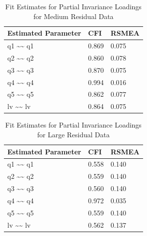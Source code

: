 \documentclass[
  man]{apa7}
\begin{document}
\begin{table}[tbp]

\begin{center}
\begin{threeparttable}

\caption{\label{tab:p-tab19}Fit Estimates for Partial Invariance Loadings for Medium Residual Data}

\begin{tabular}{lll}
\toprule
Estimated Parameter & CFI & RSMEA\\
\midrule
q1 \textasciitilde{}\textasciitilde{} q1 & 0.869 & 0.075\\
q2 \textasciitilde{}\textasciitilde{} q2 & 0.860 & 0.078\\
q3 \textasciitilde{}\textasciitilde{} q3 & 0.870 & 0.075\\
q4 \textasciitilde{}\textasciitilde{} q4 & 0.994 & 0.016\\
q5 \textasciitilde{}\textasciitilde{} q5 & 0.862 & 0.077\\
lv \textasciitilde{}\textasciitilde{} lv & 0.864 & 0.075\\
\bottomrule
\end{tabular}

\end{threeparttable}
\end{center}

\end{table}

\begin{table}[tbp]

\begin{center}
\begin{threeparttable}

\caption{\label{tab:p-tab20}Fit Estimates for Partial Invariance Loadings for Large Residual Data}

\begin{tabular}{lll}
\toprule
Estimated Parameter & CFI & RSMEA\\
\midrule
q1 \textasciitilde{}\textasciitilde{} q1 & 0.558 & 0.140\\
q2 \textasciitilde{}\textasciitilde{} q2 & 0.559 & 0.140\\
q3 \textasciitilde{}\textasciitilde{} q3 & 0.560 & 0.140\\
q4 \textasciitilde{}\textasciitilde{} q4 & 0.972 & 0.035\\
q5 \textasciitilde{}\textasciitilde{} q5 & 0.559 & 0.140\\
lv \textasciitilde{}\textasciitilde{} lv & 0.562 & 0.137\\
\bottomrule
\end{tabular}

\end{threeparttable}
\end{center}

\end{table}
\end{document}
